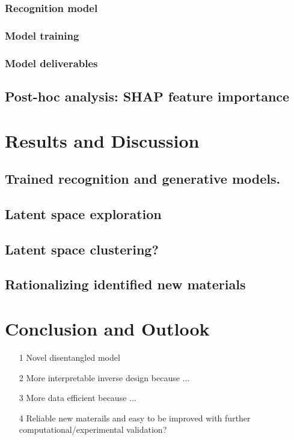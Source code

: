 \documentclass[a4paper]{article}
\begin{document}
\subsubsection{Recognition model}
\subsubsection{Model training}
\subsubsection{Model deliverables}


\subsection{Post-hoc analysis: SHAP feature importance}

\section{Results and Discussion}

\subsection{Trained recognition and generative models.}

\subsection{Latent space exploration}

\subsection{Latent space clustering?}

\subsection{Rationalizing identified new materials}

\section{Conclusion and Outlook}

\begin{enumerate}
    \item[1] Novel disentangled model
    \item[2] More interpretable inverse design because ...
    \item[3] More data efficient because ...
    \item[4] Reliable new materails and easy to be improved with further computational/experimental validation?

\end{enumerate}



\end{document}
